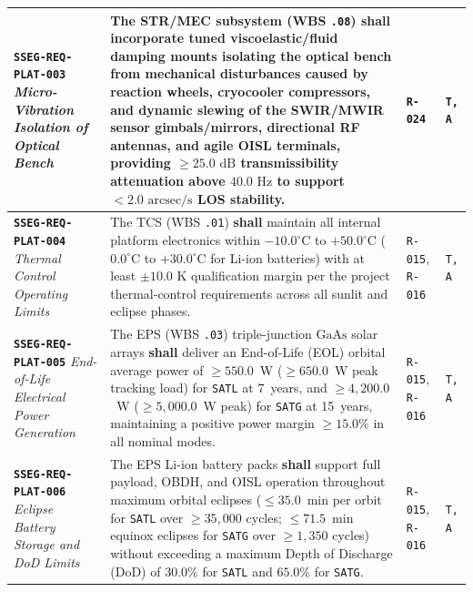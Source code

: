 \documentclass[11pt,a4paper]{article}
\providecommand{\abbr}[1]{#1}
\begin{document}
{\begin{longtable}{|>{\raggedright\arraybackslash}p{}|>{\raggedright\arraybackslash}p{}|>{\raggedright\arraybackslash}p{}|>{\raggedright\arraybackslash}p{}|}
\textbf{\texttt{SSEG-REQ-PLAT-003}} \newline \emph{Micro-Vibration Isolation of Optical Bench} & The \abbr{STR/MEC} subsystem (\abbr{WBS} \texttt{.08}) \textbf{shall} incorporate tuned viscoelastic/fluid damping mounts isolating the optical bench from mechanical disturbances caused by reaction wheels, cryocooler compressors, and dynamic slewing of the \abbr{SWIR}/\abbr{MWIR} sensor gimbals/mirrors, directional \abbr{RF} antennas, and agile \abbr{OISL} terminals, providing $\ge 25.0\text{ dB}$ transmissibility attenuation above $40.0\text{ Hz}$ to support $< 2.0\text{ arcsec/s}$ \abbr{LOS} stability. & \texttt{R-024} & \texttt{T, A} \\ \hline
\textbf{\texttt{SSEG-REQ-PLAT-004}} \newline \emph{Thermal Control Operating Limits} & The \abbr{TCS} (\abbr{WBS} \texttt{.01}) \textbf{shall} maintain all internal platform electronics within $-10.0^\circ\text{C}$ to $+50.0^\circ\text{C}$ ($0.0^\circ\text{C}$ to $+30.0^\circ\text{C}$ for $\mathrm{Li\text{-}ion}$ batteries) with at least $\pm 10.0\text{ K}$ qualification margin per the project thermal-control requirements across all sunlit and eclipse phases. & \texttt{R-015}, \texttt{R-016} & \texttt{T, A} \\ \hline
\textbf{\texttt{SSEG-REQ-PLAT-005}} \newline \emph{End-of-Life} \newline \emph{Electrical Power Generation} & The \abbr{EPS} (\abbr{WBS} \texttt{.03}) triple-junction $\mathrm{GaAs}$ solar arrays \textbf{shall} deliver an End-of-Life (\abbr{EOL}) orbital average power of $\ge 550.0$~W ($\ge 650.0$~W peak tracking load) for \texttt{SATL} at 7~years, and $\ge 4{,}200.0$~W ($\ge 5{,}000.0$~W peak) for \texttt{SATG} at 15~years, maintaining a positive power margin $\ge 15.0\%$ in all nominal modes. & \texttt{R-015}, \texttt{R-016} & \texttt{T, A} \\ \hline
\textbf{\texttt{SSEG-REQ-PLAT-006}} \newline \emph{Eclipse Battery Storage and DoD Limits} & The \abbr{EPS} $\mathrm{Li\text{-}ion}$ battery packs \textbf{shall} support full payload, \abbr{OBDH}, and \abbr{OISL} operation throughout maximum orbital eclipses ($\le 35.0$~min per orbit for \texttt{SATL} over $\ge 35{,}000$ cycles; $\le 71.5$~min equinox eclipses for \texttt{SATG} over $\ge 1{,}350$ cycles) without exceeding a maximum Depth of Discharge (\abbr{DoD}) of $30.0\%$ for \texttt{SATL} and $65.0\%$ for \texttt{SATG}. & \texttt{R-015}, \texttt{R-016} & \texttt{T, A} \\ \hline

\end{longtable}}
\end{document}
